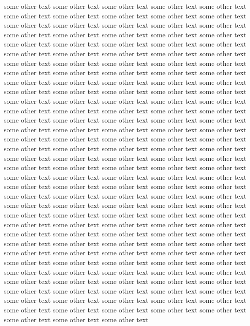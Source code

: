 \documentclass[12pt]{article}
\begin{document}
some other text some other text some other text some other text some other text some other text some other text some other text some other text some other text some other text some other text 
some other text some other text some other text some other text some other text some other text some other text some other text some other text some other text some other text some other text 
some other text some other text some other text some other text some other text some other text some other text some other text some other text some other text some other text some other text 
some other text some other text some other text some other text some other text some other text some other text some other text some other text some other text some other text some other text 
some other text some other text some other text some other text some other text some other text some other text some other text some other text some other text some other text some other text 
some other text some other text some other text some other text some other text some other text some other text some other text some other text some other text some other text some other text 
some other text some other text some other text some other text some other text some other text some other text some other text some other text some other text some other text some other text 
some other text some other text some other text some other text some other text some other text some other text some other text some other text some other text some other text some other text 
some other text some other text some other text some other text some other text some other text some other text some other text some other text some other text some other text some other text 
some other text some other text some other text some other text some other text some other text some other text some other text some other text some other text some other text some other text 
some other text some other text some other text some other text some other text some other text some other text some other text some other text some other text some other text some other text 
some other text some other text some other text some other text some other text some other text some other text some other text some other text some other text some other text some other text 
some other text some other text some other text some other text some other text some other text some other text some other text some other text some other text some other text some other text 
some other text some other text some other text some other text some other text some other text some other text some other text some other text some other text some other text some other text 
\end{document}
